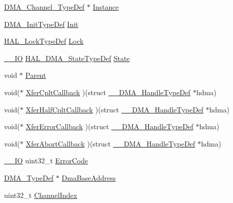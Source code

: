 \begin{DoxyCompactItemize}
\item 
\hyperlink{struct_d_m_a___channel___type_def}{D\+M\+A\+\_\+\+Channel\+\_\+\+Type\+Def} $\ast$ \hyperlink{struct_____d_m_a___handle_type_def_adc5940b5bbf1fc712118cd40ff3ea69b}{Instance}
\item 
\hyperlink{struct_d_m_a___init_type_def}{D\+M\+A\+\_\+\+Init\+Type\+Def} \hyperlink{struct_____d_m_a___handle_type_def_a4352c7144ad5e1e4ab54a87d3be6eb62}{Init}
\item 
\hyperlink{stm32f0xx__hal__def_8h_ab367482e943333a1299294eadaad284b}{H\+A\+L\+\_\+\+Lock\+Type\+Def} \hyperlink{struct_____d_m_a___handle_type_def_ad4cf225029dbefe8d3fe660c33b8bb6b}{Lock}
\item 
\hyperlink{core__sc300_8h_aec43007d9998a0a0e01faede4133d6be}{\+\_\+\+\_\+\+IO} \hyperlink{group___d_m_a___exported___types_ga9c012af359987a240826f29073bbe463}{H\+A\+L\+\_\+\+D\+M\+A\+\_\+\+State\+Type\+Def} \hyperlink{struct_____d_m_a___handle_type_def_a2263083d2bfa96222f3d7b8339c6faf8}{State}
\item 
void $\ast$ \hyperlink{struct_____d_m_a___handle_type_def_a6ee5f2130887847bbc051932ea43b73d}{Parent}
\item 
void($\ast$ \hyperlink{struct_____d_m_a___handle_type_def_a62a5dfe04a3c53000f26d741e4a27ab4}{Xfer\+Cplt\+Callback} )(struct \hyperlink{struct_____d_m_a___handle_type_def}{\+\_\+\+\_\+\+D\+M\+A\+\_\+\+Handle\+Type\+Def} $\ast$hdma)
\item 
void($\ast$ \hyperlink{struct_____d_m_a___handle_type_def_afef2948f0688c22257a540f699e31720}{Xfer\+Half\+Cplt\+Callback} )(struct \hyperlink{struct_____d_m_a___handle_type_def}{\+\_\+\+\_\+\+D\+M\+A\+\_\+\+Handle\+Type\+Def} $\ast$hdma)
\item 
void($\ast$ \hyperlink{struct_____d_m_a___handle_type_def_a074ff1d4bf731a9cd85e554f1faec29b}{Xfer\+Error\+Callback} )(struct \hyperlink{struct_____d_m_a___handle_type_def}{\+\_\+\+\_\+\+D\+M\+A\+\_\+\+Handle\+Type\+Def} $\ast$hdma)
\item 
void($\ast$ \hyperlink{struct_____d_m_a___handle_type_def_a70376f061d856fdda49c8c23c9bb5b22}{Xfer\+Abort\+Callback} )(struct \hyperlink{struct_____d_m_a___handle_type_def}{\+\_\+\+\_\+\+D\+M\+A\+\_\+\+Handle\+Type\+Def} $\ast$hdma)
\item 
\hyperlink{core__sc300_8h_aec43007d9998a0a0e01faede4133d6be}{\+\_\+\+\_\+\+IO} uint32\+\_\+t \hyperlink{struct_____d_m_a___handle_type_def_a123c5063e6a3b1901b2fbe5f88c53a7e}{Error\+Code}
\item 
\hyperlink{struct_d_m_a___type_def}{D\+M\+A\+\_\+\+Type\+Def} $\ast$ \hyperlink{struct_____d_m_a___handle_type_def_adaadecc05539a447843606e1e511d992}{Dma\+Base\+Address}
\item 
uint32\+\_\+t \hyperlink{struct_____d_m_a___handle_type_def_ae2d85e64eb57a8bccd3f70e74db09c31}{Channel\+Index}
\end{DoxyCompactItemize}


